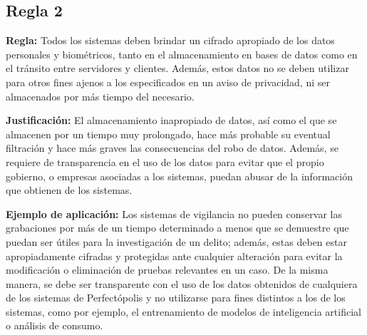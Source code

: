 \subsection*{Regla 2}
\begin{itemizeColor}
    \item \textbf{Regla:} 
Todos los sistemas deben brindar un cifrado apropiado de los datos personales y biométricos, tanto en el almacenamiento en bases de datos como en el tránsito entre servidores y clientes. Además, estos datos no se deben utilizar para otros fines ajenos a los especificados en un aviso de privacidad, ni ser almacenados por más tiempo del necesario.
    \item \textbf{Justificación:} 
	    El almacenamiento inapropiado de datos, así como el que se almacenen por un tiempo muy prolongado, hace más probable su eventual filtración y hace más graves las consecuencias del robo de datos. Además, se requiere de transparencia en el uso de los datos para evitar que el propio gobierno, o empresas asociadas a los sistemas, puedan abusar de la información que obtienen de los sistemas.

    \item \textbf{Ejemplo de aplicación:} 
	    Los sistemas de vigilancia no pueden conservar las grabaciones por más de un tiempo determinado a menos que se demuestre que puedan ser útiles para la investigación de un delito; además, estas deben estar apropiadamente cifradas y protegidas ante cualquier alteración para evitar la modificación o eliminación de pruebas relevantes en un caso. De la misma manera, se debe ser transparente con el uso de los datos obtenidos de cualquiera de los sistemas de Perfectópolis y no utilizarse para fines distintos a los de los sistemas, como por ejemplo, el entrenamiento de modelos de inteligencia artificial o análisis de consumo.
\end{itemizeColor}

